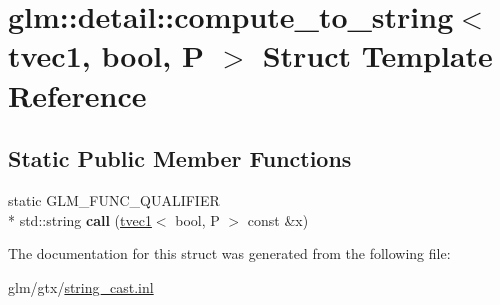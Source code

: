 \hypertarget{structglm_1_1detail_1_1compute__to__string_3_01tvec1_00_01bool_00_01P_01_4}{\section{glm\-:\-:detail\-:\-:compute\-\_\-to\-\_\-string$<$ tvec1, bool, P $>$ Struct Template Reference}
\label{structglm_1_1detail_1_1compute__to__string_3_01tvec1_00_01bool_00_01P_01_4}
}
\subsection*{Static Public Member Functions}
\begin{DoxyCompactItemize}
\item 
\hypertarget{structglm_1_1detail_1_1compute__to__string_3_01tvec1_00_01bool_00_01P_01_4_aea165ad1c3cf2cf3339182c54d28ae1a}{static G\-L\-M\-\_\-\-F\-U\-N\-C\-\_\-\-Q\-U\-A\-L\-I\-F\-I\-E\-R \\*
std\-::string {\bfseries call} (\hyperlink{structglm_1_1tvec1}{tvec1}$<$ bool, P $>$ const \&x)}\label{structglm_1_1detail_1_1compute__to__string_3_01tvec1_00_01bool_00_01P_01_4_aea165ad1c3cf2cf3339182c54d28ae1a}

\end{DoxyCompactItemize}


The documentation for this struct was generated from the following file\-:\begin{DoxyCompactItemize}
\item 
glm/gtx/\hyperlink{string__cast_8inl}{string\-\_\-cast.\-inl}\end{DoxyCompactItemize}
